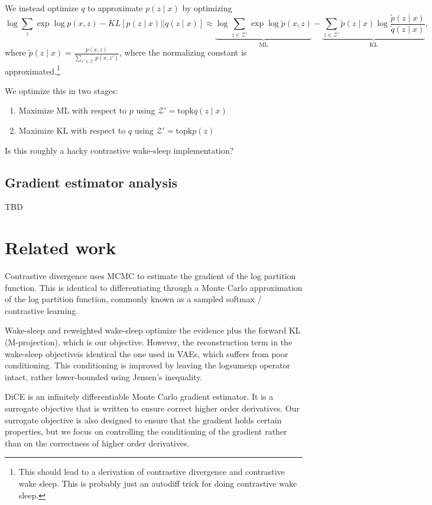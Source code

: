 \documentclass[12pt]{article}
\begin{document}
We instead optimize $q$ to approximate $p(z\mid x)$ by optimizing
\begin{equation}
\log\sum_z\exp \log p(x,z) - KL[p(z\mid x) || q(z \mid x)]
\approx 
\underbrace{\log\sum_{z\in\mathcal{Z}'}\exp \log \tilde{p}(x,z)}_{\text{ML}}
-
\underbrace{
\sum_{z\in\mathcal{Z}'}\tilde{p}(z\mid x) \log \frac{\tilde{p}(z\mid x)}{\tilde{q}(z \mid x)}
}_{\text{KL}},
\end{equation}
where $\tilde{p}(z\mid x) = \frac{p(x,z)}{\sum_{z' \in \mathcal{Z}'}p(x,z')}$,
where the normalizing constant is approximated.\footnote{
    This should lead to a derivation of contrastive divergence and contrastive wake sleep.
    This is probably just an autodiff trick for doing contrastive wake sleep.
}

We optimize this in two stages:
\begin{enumerate}
\item Maximize ML with respect to $p$ using $\mathcal{Z}' = \text{topk} q(z\mid x)$
\item Maximize KL with respect to $q$ using $\mathcal{Z}' = \text{topk} p(z)$
\end{enumerate}

Is this roughly a hacky contrastive wake-sleep implementation?

\subsection{Gradient estimator analysis}
TBD

\section{Related work}
Contrastive divergence uses MCMC to estimate the gradient of the log partition function.
This is identical to differentiating through a Monte Carlo approximation of the
log partition function, commonly known as a sampled softmax / contrastive learning.

Wake-sleep and reweighted wake-sleep optimize the evidence plus the forward KL (M-projection),
which is our objective.
However, the reconstruction term in the wake-sleep objectiveis identical the one used in
VAEs, which suffers from poor conditioning.
This conditioning is improved by leaving the logsumexp operator intact,
rather lower-bounded using Jensen's inequality.

DiCE is an infinitely differentiable Monte Carlo gradient estimator.
It is a surrogate objective that is written to ensure correct higher order derivatives.
Our surrogate objective is also designed to ensure that the gradient holds certain properties,
but we focus on controlling the conditioning of the gradient rather than on the correctness
of higher order derivatives.
\end{document}
